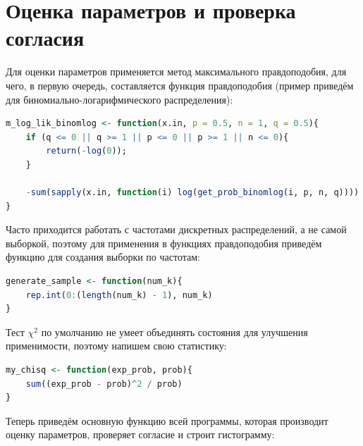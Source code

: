 \documentclass[12pt, specialist, subf, substylefile = spbu_report.rtx]{disser}
\begin{document}
	\section{Оценка параметров и проверка согласия}
	
	Для оценки параметров применяется метод максимального правдоподобия, для чего, в первую очередь, составляется функция правдоподобия (пример приведём для биномиально-логарифмического распределения):
	
	\begin{lstlisting}[language=R]
m_log_lik_binomlog <- function(x.in, p = 0.5, n = 1, q = 0.5){
	if (q <= 0 || q >= 1 || p <= 0 || p >= 1 || n <= 0){
		return(-log(0));
	}
	
	-sum(sapply(x.in, function(i) log(get_prob_binomlog(i, p, n, q))))
}
	\end{lstlisting}

	Часто приходится работать с частотами дискретных распределений, а не самой выборкой, поэтому для применения в функциях правдоподобия приведём функцию для создания выборки по частотам:
	
\begin{lstlisting}[language=R]
generate_sample <- function(num_k){
	rep.int(0:(length(num_k) - 1), num_k)
}
\end{lstlisting}	

	Тест $\chi ^2$ по умолчанию не умеет объединять состояния для улучшения применимости, поэтому напишем свою статистику:
	
\begin{lstlisting}[language=R]
my_chisq <- function(exp_prob, prob){
	sum((exp_prob - prob)^2 / prob)
}
\end{lstlisting}

	Теперь приведём основную функцию всей программы, которая производит оценку параметров, проверяет согласие и строит гистограмму:
\end{document}
